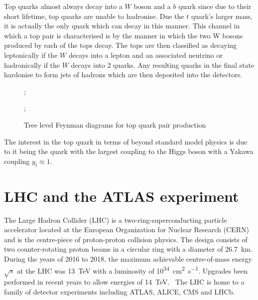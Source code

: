 \documentclass[a4paper,11pt]{article}
\begin{document}
Top quarks almost always decay into a $W$ boson and a $b$ quark since due to their short lifetime, top quarks are unable to hadronise.
Due the $t$ quark's larger mass, it is actually the only quark which can decay in this manner.
This channel in which a top pair is characterised is by the manner in which the two W bosons produced by each of the tops decay.
The tops are then classified as decaying leptonically if the $W$ decays into a lepton and an associated neutrino or hadronically if the $W$ decays into 2 quarks.
Any resulting quarks in the final state hardonise to form jets of hadrons which are then deposited into the detectors.

\begin{figure}[htb]
    \centering
    ;

    ;
    \caption{Tree level Feynman diagrams for top quark pair production}
\end{figure}


\nocite{Thomson:2013zua}
The interest in the top quark in terms of beyond standard model physics is due to it being the quark with the largest coupling to the Higgs boson with a Yakawa coupling $y_{t} \approx 1$.

\section{LHC and the ATLAS experiment}
The Large Hadron Collider (LHC) is a two-ring-superconducting particle accelerator located at the European Organization for Nuclear Research (CERN) and is the centre-piece of proton-proton collision physics.
The design consists of two counter-rotating proton beams in a circular ring with a diameter of \SI{26.7}{\kilo\metre}.
During the years of 2016 to 2018, the maximum achievable centre-of-mass energy $\sqrt{s}$ at the LHC was \SI{13}{\tera\electronvolt} with a luminosity of \si{10^{34}\centi\metre\squared\per\second}.
Upgrades been performed in recent years to allow energies of \SI{14}{\tera\electronvolt}.~\nocite{Evans:2008zzb}
The LHC is home to a family of detector experiments including ATLAS, ALICE, CMS and LHCb.
\end{document}
